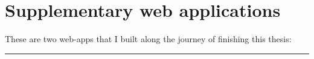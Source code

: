 %
%

\chapter*{Supplementary web applications}
\label{sup:web-applications}

\begingroup
\setcounter{figure}{0}
\renewcommand{\thefigure}{\Roman{figure}}

\newcommand{\VolvoxURL}{https://volvox.site}
\newcommand{\PortfolioURL}{https://volvox.site/adam-aldridge}
\newcommand{\ThesisURL}{https://www.volvox.site/adam-aldridge-phd-thesis}
\newcommand{\MarkovURL}{https://markov.volvox.site}

These are two web-apps that I built along the journey of finishing this thesis:

\medskip
\hrule
\medskip

